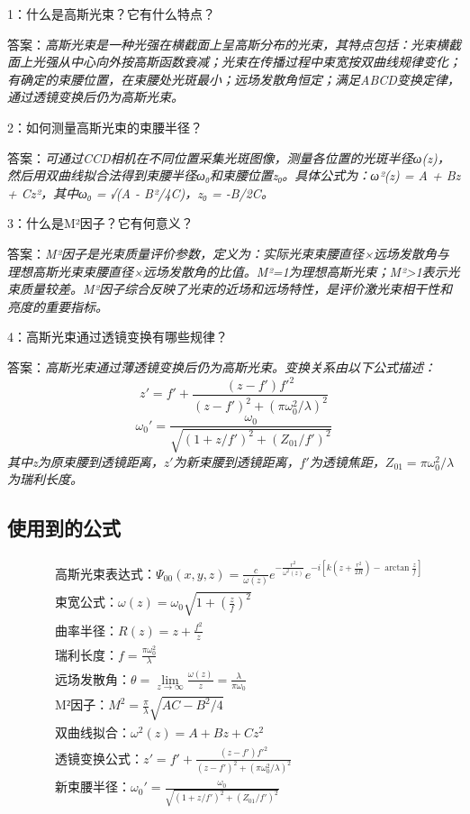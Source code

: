 \documentclass[10pt,journal,compsoc]{IEEEtran}
\begin{document}
1：什么是高斯光束？它有什么特点？

答案：\textit{高斯光束是一种光强在横截面上呈高斯分布的光束，其特点包括：光束横截面上光强从中心向外按高斯函数衰减；光束在传播过程中束宽按双曲线规律变化；有确定的束腰位置，在束腰处光斑最小；远场发散角恒定；满足ABCD变换定律，通过透镜变换后仍为高斯光束。}

2：如何测量高斯光束的束腰半径？

答案：\textit{可通过CCD相机在不同位置采集光斑图像，测量各位置的光斑半径ω(z)，然后用双曲线拟合法得到束腰半径ω₀和束腰位置z₀。具体公式为：ω²(z) = A + Bz + Cz²，其中ω₀ = √(A - B²/4C)，z₀ = -B/2C。}

3：什么是M²因子？它有何意义？

答案：\textit{M²因子是光束质量评价参数，定义为：实际光束束腰直径×远场发散角与理想高斯光束束腰直径×远场发散角的比值。M²=1为理想高斯光束；M²>1表示光束质量较差。M²因子综合反映了光束的近场和远场特性，是评价激光束相干性和亮度的重要指标。}

4：高斯光束通过透镜变换有哪些规律？

答案：\textit{高斯光束通过薄透镜变换后仍为高斯光束。变换关系由以下公式描述：
\[ z' = f' + \frac{(z-f')f'^2}{(z-f')^2 + (\pi\omega_0^2/\lambda)^2} \]
\[ \omega_0' = \frac{\omega_0}{\sqrt{(1+z/f')^2 + (Z_{01}/f')^2}} \]
其中z为原束腰到透镜距离，$z'$为新束腰到透镜距离，$f'$为透镜焦距，$Z_{01}=\pi\omega_0^2/\lambda$为瑞利长度。}

\subsection{使用到的公式}
\begin{align*}
&\text{高斯光束表达式：}\Psi_{00}(x,y,z)=\frac{c}{\omega(z)}e^{-\frac{r^2}{\omega^2(z)}}e^{-i\left[k\left(z+\frac{r^2}{2R}\right)-\arctan\frac{z}{f}\right]} \\
&\text{束宽公式：}\omega(z)=\omega_0\sqrt{1+\left(\frac{z}{f}\right)^2} \\
&\text{曲率半径：}R(z)=z+\frac{f^2}{z} \\
&\text{瑞利长度：}f=\frac{\pi\omega_0^2}{\lambda} \\
&\text{远场发散角：}\theta=\lim_{z\to\infty}\frac{\omega(z)}{z}=\frac{\lambda}{\pi\omega_0} \\
&\text{M²因子：}M^2=\frac{\pi}{\lambda}\sqrt{AC-B^2/4} \\
&\text{双曲线拟合：}\omega^2(z)=A+Bz+Cz^2 \\
&\text{透镜变换公式：}z'=f'+\frac{(z-f')f'^2}{(z-f')^2+(\pi\omega_0^2/\lambda)^2} \\
&\text{新束腰半径：}\omega_0'=\frac{\omega_0}{\sqrt{(1+z/f')^2+(Z_{01}/f')^2}}
\end{align*}
\end{document}
